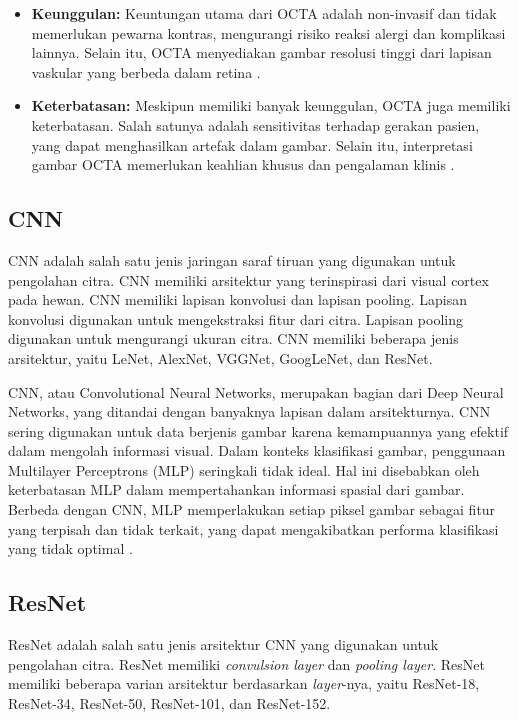\begin{itemize}
    \item \textbf{Keunggulan:} Keuntungan utama dari OCTA adalah non-invasif dan tidak memerlukan pewarna kontras, mengurangi risiko reaksi alergi dan komplikasi lainnya. Selain itu, OCTA menyediakan gambar resolusi tinggi dari lapisan vaskular yang berbeda dalam retina \parencite{spaide2018retinal}.
    \item \textbf{Keterbatasan:} Meskipun memiliki banyak keunggulan, OCTA juga memiliki keterbatasan. Salah satunya adalah sensitivitas terhadap gerakan pasien, yang dapat menghasilkan artefak dalam gambar. Selain itu, interpretasi gambar OCTA memerlukan keahlian khusus dan pengalaman klinis \parencite{jia2012split}.
\end{itemize}

\subsection{CNN}
\label{sec:223}

CNN adalah salah satu jenis jaringan saraf tiruan yang digunakan untuk pengolahan citra. CNN memiliki arsitektur yang terinspirasi dari visual cortex pada hewan. CNN memiliki lapisan konvolusi dan lapisan pooling. Lapisan konvolusi digunakan untuk mengekstraksi fitur dari citra. Lapisan pooling digunakan untuk mengurangi ukuran citra. CNN memiliki beberapa jenis arsitektur, yaitu LeNet, AlexNet, VGGNet, GoogLeNet, dan ResNet.

CNN, atau Convolutional Neural Networks, merupakan bagian dari Deep Neural Networks, yang ditandai dengan banyaknya lapisan dalam arsitekturnya. CNN sering digunakan untuk data berjenis gambar karena kemampuannya yang efektif dalam mengolah informasi visual. Dalam konteks klasifikasi gambar, penggunaan Multilayer Perceptrons (MLP) seringkali tidak ideal. Hal ini disebabkan oleh keterbatasan MLP dalam mempertahankan informasi spasial dari gambar. Berbeda dengan CNN, MLP memperlakukan setiap piksel gambar sebagai fitur yang terpisah dan tidak terkait, yang dapat mengakibatkan performa klasifikasi yang tidak optimal \parencite{AstutiSamsuryadi2018}.

\subsection{ResNet}
\label{sec:224}

ResNet adalah salah satu jenis arsitektur CNN yang digunakan untuk pengolahan citra. ResNet memiliki \emph{convulsion layer} dan \emph{pooling layer}. ResNet memiliki beberapa varian arsitektur berdasarkan \emph{layer}-nya, yaitu ResNet-18, ResNet-34, ResNet-50, ResNet-101, dan ResNet-152. 


